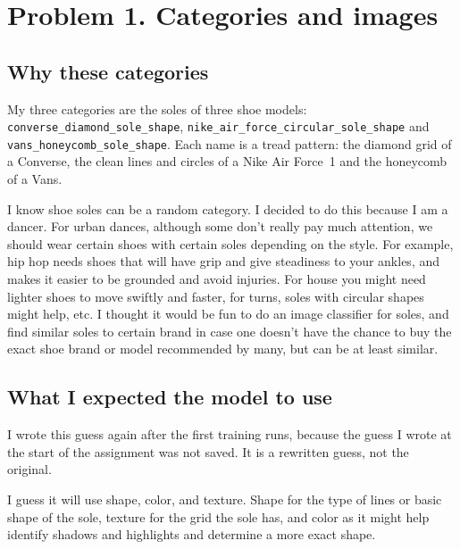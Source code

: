 \documentclass[11pt]{article}
\begin{document}
\makeheader

\section*{Problem 1. Categories and images}
\subsection*{Why these categories}
My three categories are the soles of three shoe models: \texttt{converse\_diamond\_sole\_shape}, \texttt{nike\_air\_force\_circular\_sole\_shape} and \texttt{vans\_honeycomb\_sole\_shape}. Each name is a tread pattern: the diamond grid of a Converse, the clean lines and circles of a Nike Air Force~1 and the honeycomb of a Vans.

I know shoe soles can be a random category. I decided to do this because I am a dancer. For urban dances, although some don't really pay much attention, we should wear certain shoes with certain soles depending on the style. For example, hip hop needs shoes that will have grip and give steadiness to your ankles, and makes it easier to be grounded and avoid injuries. For house you might need lighter shoes to move swiftly and faster, for turns, soles with circular shapes might help, etc. I thought it would be fun to do an image classifier for soles, and find similar soles to certain brand in case one doesn't have the chance to buy the exact shoe brand or model recommended by many, but can be at least similar.

\subsection*{What I expected the model to use}
I wrote this guess again after the first training runs, because the guess I wrote at the start of the assignment was not saved. It is a rewritten guess, not the original.

I guess it will use shape, color, and texture. Shape for the type of lines or basic shape of the sole, texture for the grid the sole has, and color as it might help identify shadows and highlights and determine a more exact shape.
\end{document}
